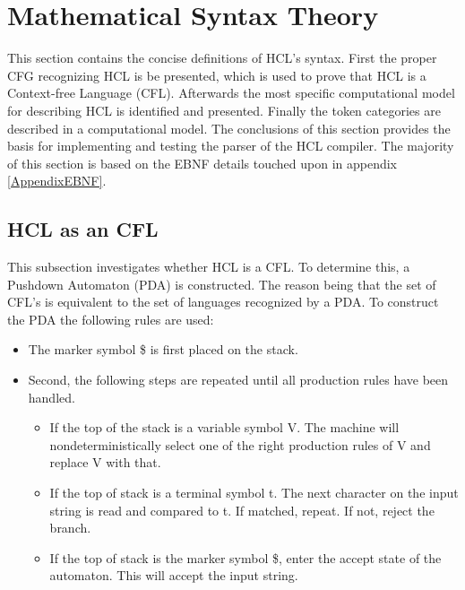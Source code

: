 \section{Mathematical Syntax Theory}
This section contains the concise definitions of HCL's syntax.
First the proper CFG recognizing HCL is be presented, which is used to prove that HCL is a Context-free Language (CFL). 
Afterwards the most specific computational model for describing HCL is identified and presented. 
Finally the token categories are described in a computational model. 
The conclusions of this section provides the basis for implementing and testing the parser of the HCL compiler. 
The majority of this section is based on the EBNF details touched upon in appendix \ref{AppendixEBNF}.

\subsection{HCL as an CFL}
This subsection investigates whether HCL is a CFL. 
To determine this, a Pushdown Automaton (PDA) is constructed.
The reason being that the set of CFL's is equivalent to the set of languages recognized by a PDA.
To construct the PDA the following rules are used:
\begin{center}
	\begin{itemize}
		\item The marker symbol \$ is first placed on the stack.
		\item Second, the following steps are repeated until all production rules have been handled.
		\begin{itemize}
			\item If the top of the stack is a variable symbol V. 
			The machine will nondeterministically select one of the right production rules of V and replace V with that.   
			\item If the top of stack is a terminal symbol t. 
			The next character on the input string is read and compared to t. 
			If matched, repeat. 
			If not, reject the branch.
			\item If the top of stack is the marker symbol \$, enter the accept state of the automaton. 
			This will accept the input string.
		\end{itemize}
	\end{itemize}
\end{center}

